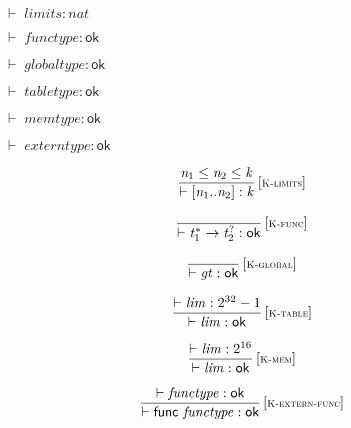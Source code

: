 \vspace{1ex}

$\boxed{{ \vdash }\;{\mathit{limits}} : {\mathit{nat}}}$

$\boxed{{ \vdash }\;{\mathit{functype}} : \mathsf{ok}}$

$\boxed{{ \vdash }\;{\mathit{globaltype}} : \mathsf{ok}}$

$\boxed{{ \vdash }\;{\mathit{tabletype}} : \mathsf{ok}}$

$\boxed{{ \vdash }\;{\mathit{memtype}} : \mathsf{ok}}$

$\boxed{{ \vdash }\;{\mathit{externtype}} : \mathsf{ok}}$

\vspace{1ex}

$$
\begin{array}{@{}c@{}}\displaystyle
\frac{
{\mathit{n}}_{{1}} \leq {\mathit{n}}_{{2}} \leq {\mathit{k}}
}{
{ \vdash }\;{}[{\mathit{n}}_{{1}} .. {\mathit{n}}_{{2}}] : {\mathit{k}}
} \, {[\textsc{\scriptsize K{-}limits}]}
\qquad
\end{array}
$$

$$
\begin{array}{@{}c@{}}\displaystyle
\frac{
}{
{ \vdash }\;{{\mathit{t}}_{{1}}^\ast} \rightarrow {{\mathit{t}}_{{2}}^?} : \mathsf{ok}
} \, {[\textsc{\scriptsize K{-}func}]}
\qquad
\end{array}
$$

$$
\begin{array}{@{}c@{}}\displaystyle
\frac{
}{
{ \vdash }\;{\mathit{gt}} : \mathsf{ok}
} \, {[\textsc{\scriptsize K{-}global}]}
\qquad
\end{array}
$$

$$
\begin{array}{@{}c@{}}\displaystyle
\frac{
{ \vdash }\;{\mathit{lim}} : {2^{32}} - 1
}{
{ \vdash }\;{\mathit{lim}} : \mathsf{ok}
} \, {[\textsc{\scriptsize K{-}table}]}
\qquad
\end{array}
$$

$$
\begin{array}{@{}c@{}}\displaystyle
\frac{
{ \vdash }\;{\mathit{lim}} : {2^{16}}
}{
{ \vdash }\;{\mathit{lim}} : \mathsf{ok}
} \, {[\textsc{\scriptsize K{-}mem}]}
\qquad
\end{array}
$$

\vspace{1ex}

$$
\begin{array}{@{}c@{}}\displaystyle
\frac{
{ \vdash }\;{\mathit{functype}} : \mathsf{ok}
}{
{ \vdash }\;\mathsf{func}~{\mathit{functype}} : \mathsf{ok}
} \, {[\textsc{\scriptsize K{-}extern{-}func}]}
\qquad
\end{array}
$$

